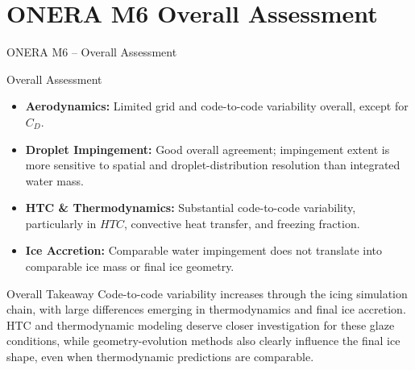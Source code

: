 
\section[Overview]{\textbf{ONERA M6 Overall Assessment}}


\begin{frame}{\small ONERA M6 -- Overall Assessment}
\scriptsize

\begin{block}{\scriptsize Overall Assessment}
\begin{itemize}
    \item \textbf{Aerodynamics:} Limited grid and code-to-code variability overall, except for $C_D$.
    \item \textbf{Droplet Impingement:} Good overall agreement; impingement extent is more sensitive to spatial and droplet-distribution resolution than integrated water mass.
    \item \textbf{HTC \& Thermodynamics:} Substantial code-to-code variability, particularly in $HTC$, convective heat transfer, and freezing fraction.
    \item \textbf{Ice Accretion:} Comparable water impingement does not translate into comparable ice mass or final ice geometry.
\end{itemize}
\end{block}

\vspace{0.10cm}

\begin{alertblock}{\scriptsize Overall Takeaway}
Code-to-code variability increases through the icing simulation chain, with large differences emerging in thermodynamics and final ice accretion. HTC and thermodynamic modeling deserve closer investigation for these glaze conditions, while geometry-evolution methods also clearly influence the final ice shape, even when thermodynamic predictions are comparable.
\end{alertblock}

\end{frame}